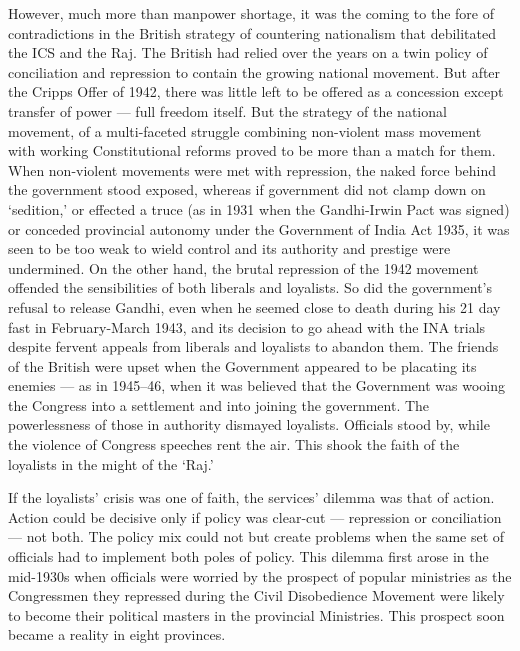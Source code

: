 \begin{multicols}{2}
However, much more than manpower shortage, it was the coming to the fore of contradictions in the British strategy of countering nationalism that debilitated the ICS and the Raj. The British had relied over the years on a twin policy of conciliation and repression to contain the growing national movement. But after the Cripps Offer of 1942, there was little left to be offered as a concession except transfer of power --- full freedom itself. But the strategy of the national movement, of a multi-faceted struggle combining non-violent mass movement with working Constitutional reforms proved to be more than a match for them. When non-violent movements were met with repression, the naked force behind the government stood exposed, whereas if government did not clamp down on `sedition,' or effected a truce (as in 1931 when the Gandhi-Irwin Pact was signed) or conceded provincial autonomy under the Government of India Act 1935, it was seen to be too weak to wield control and its authority and prestige were undermined. On the other hand, the brutal repression of the 1942 movement offended the sensibilities of both liberals and loyalists. So did the government's refusal to release Gandhi, even when he seemed close to death during his 21 day fast in February-March 1943, and its decision to go ahead with the INA trials despite fervent appeals from liberals and loyalists to abandon them. The friends of the British were upset when the Government appeared to be placating its enemies --- as in 1945--46, when it was believed that the Government was wooing the Congress into a settlement and into joining the government. The powerlessness of those in authority dismayed loyalists. Officials stood by, while the violence of Congress speeches rent the air. This shook the faith of the loyalists in the might of the `Raj.' 

If the loyalists' crisis was one of faith, the services' dilemma was that of action. Action could be decisive only if policy was clear-cut --- repression or conciliation --- not both. The policy mix could not but create problems when the same set of officials had to implement both poles of policy. This dilemma first arose in the mid-1930s when officials were worried by the prospect of popular ministries as the Congressmen they repressed during the Civil Disobedience Movement were likely to become their political masters in the provincial Ministries. This prospect soon became a reality in eight provinces. 


\end{multicols}
